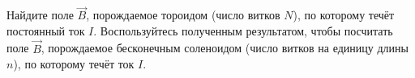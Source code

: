 \documentclass[__main__.tex]{subfiles}
\begin{document}
Найдите поле $\vec{B}$, порождаемое тороидом (число витков $N$), по которому течёт постоянный ток $I$. Воспользуйтесь полученным результатом, чтобы посчитать поле $\vec{B}$, порождаемое бесконечным соленоидом (число витков на единицу длины $n$), по которому течёт ток $I$.\\ 

\end{document}
